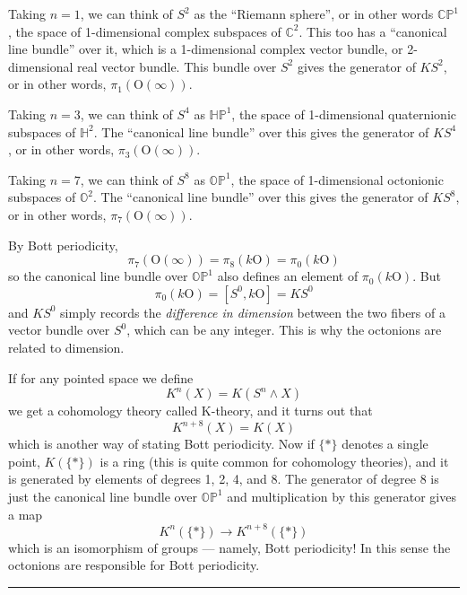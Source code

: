 \documentclass{article}
\begin{document}
Taking \(n = 1\), we can think of \(S^2\) as the ``Riemann sphere'', or
in other words \(\mathbb{CP}^1\), the space of 1-dimensional complex
subspaces of \(\mathbb{C}^2\). This too has a ``canonical line bundle''
over it, which is a 1-dimensional complex vector bundle, or
2-dimensional real vector bundle. This bundle over \(S^2\) gives the
generator of \(KS^2\), or in other words, \(\pi_1(\mathrm{O}(\infty))\).

Taking \(n = 3\), we can think of \(S^4\) as \(\mathbb{HP}^1\), the
space of 1-dimensional quaternionic subspaces of \(\mathbb{H}^2\). The
``canonical line bundle'' over this gives the generator of \(KS^4\), or
in other words, \(\pi_3(\mathrm{O}(\infty))\).

Taking \(n = 7\), we can think of \(S^8\) as \(\mathbb{OP}^1\), the
space of 1-dimensional octonionic subspaces of \(\mathbb{O}^2\). The
``canonical line bundle'' over this gives the generator of \(KS^8\), or
in other words, \(\pi_7(\mathrm{O}(\infty))\).

By Bott periodicity,
\[\pi_7(\mathrm{O}(\infty)) = \pi_8(k\mathrm{O}) = \pi_0(k\mathrm{O})\]
so the canonical line bundle over \(\mathbb{OP}^1\) also defines an
element of \(\pi_0(k\mathrm{O})\). But
\[\pi_0(k\mathrm{O}) = [S^0,k\mathrm{O}] = KS^0\] and \(KS^0\) simply
records the \emph{difference in dimension} between the two fibers of a
vector bundle over \(S^0\), which can be any integer. This is why the
octonions are related to dimension.

If for any pointed space we define \[K^n(X) = K(S^n\wedge X)\] we get a
cohomology theory called K-theory, and it turns out that
\[K^{n+8}(X) = K(X)\] which is another way of stating Bott periodicity.
Now if \(\{*\}\) denotes a single point, \(K(\{*\})\) is a ring (this is
quite common for cohomology theories), and it is generated by elements
of degrees 1, 2, 4, and 8. The generator of degree 8 is just the
canonical line bundle over \(\mathbb{OP}^1\) and multiplication by this
generator gives a map \[K^n(\{*\})\to K^{n+8}(\{*\})\] which is an
isomorphism of groups --- namely, Bott periodicity! In this sense the
octonions are responsible for Bott periodicity.

\begin{center}\rule{0.5\linewidth}{0.5pt}\end{center}
\end{document}
